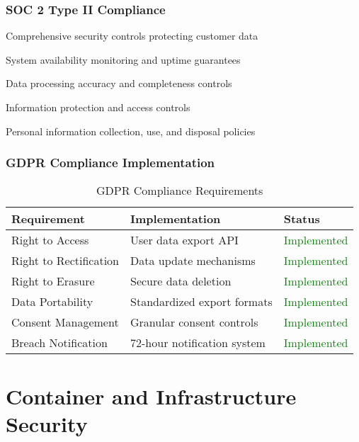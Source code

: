 \subsubsection{SOC 2 Type II Compliance}

\begin{description}[leftmargin=*]
    \item[Security] Comprehensive security controls protecting customer data
    \item[Availability] System availability monitoring and uptime guarantees
    \item[Processing Integrity] Data processing accuracy and completeness controls
    \item[Confidentiality] Information protection and access controls
    \item[Privacy] Personal information collection, use, and disposal policies
\end{description}

\subsubsection{GDPR Compliance Implementation}

\begin{table}[H]
\centering
\caption{GDPR Compliance Requirements}
\begin{tabular}{|p{3cm}|p{4cm}|p{5cm}|}
\hline
\textbf{Requirement} & \textbf{Implementation} & \textbf{Status} \\
\hline
Right to Access & User data export API & \textcolor{green}{Implemented} \\
\hline
Right to Rectification & Data update mechanisms & \textcolor{green}{Implemented} \\
\hline
Right to Erasure & Secure data deletion & \textcolor{green}{Implemented} \\
\hline
Data Portability & Standardized export formats & \textcolor{green}{Implemented} \\
\hline
Consent Management & Granular consent controls & \textcolor{green}{Implemented} \\
\hline
Breach Notification & 72-hour notification system & \textcolor{green}{Implemented} \\
\hline
\end{tabular}
\end{table}

\section{Container and Infrastructure Security}

